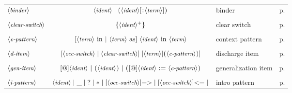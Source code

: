 \begin{longtable}{lclr}
$\langle\mbox{\itshape\rmfamily\small binder}\rangle$  & $\N{ident} \;|\; \C{(} \N{ident} [ \C{:} \N{term} ] \C{)}$ & 
  binder& p. \pageref{ssec:pose}\\
\\
$\langle\mbox{\itshape\rmfamily\small clear-switch}\rangle$  & $\C{\{} \N{ident}^+ \C{\}}$ & clear switch &
p. \pageref{ssec:discharge}\\
\\
$\langle\mbox{\itshape\rmfamily\small c-pattern}\rangle$ & 
  $[\N{term}\ \C{in}\ |\ \N{term}\ \C{as}]\ \N{ident}\ \C{in}\ \N{term}$
  & context pattern & p. \pageref{ssec:rewp} \\
\\
$\langle\mbox{\itshape\rmfamily\small d-item}\rangle$ & $[\N{occ-switch} \;|\; \N{clear-switch}]\;
  [\N{term}|\C{(}\N{c-pattern}\C{)}]$ &
discharge item &
p. \pageref{ssec:discharge}\\
\\
$\langle\mbox{\itshape\rmfamily\small gen-item}\rangle$  & $[\C{@}]\N{ident}\ |\ \C{(}\N{ident}\C{)}\ |\ \C{(}[\C{@}]\N{ident}\ \C{:=}\ \N{c-pattern}\C{)}$ & generalization item &
p. \pageref{ssec:struct}\\
\\
$\langle\mbox{\itshape\rmfamily\small i-pattern}\rangle$ & $\N{ident} \;|\; \C{_} \;|\; \C{?} \;|\; \C{*}\;|\; 
  [\N{occ-switch}]\C{->} \;|\; [\N{occ-switch}]\C{<-} \;|$ &  intro pattern &
p. \pageref{ssec:intro}\\


\end{longtable}
